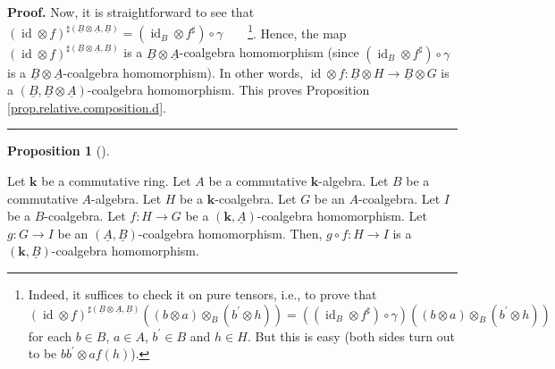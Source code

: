 \documentclass[numbers=enddot,12pt,final,onecolumn,notitlepage,abstracton]{scrartcl}%
\theoremstyle{definition}
\newtheorem{prop}[theo]{Proposition}
\newenvironment{proposition}[1][]
{\begin{prop}[#1]\begin{leftbar}}
{\end{leftbar}\end{prop}}
\newenvironment{proof}[1][Proof]{\noindent\textbf{#1.} }{\ \rule{0.5em}{0.5em}}
\begin{document}
\begin{proof}
Now, it is straightforward to see that $\left(  \operatorname*{id}\otimes
f\right)  ^{\sharp\left(  \underline{B}\otimes\underline{A},\underline{B}%
\right)  }=\left(  \operatorname*{id}\nolimits_{B}\otimes f^{\sharp}\right)
\circ\gamma$\ \ \ \ \footnote{Indeed, it suffices to check it on pure tensors,
i.e., to prove that
\[
\left(  \operatorname*{id}\otimes f\right)  ^{\sharp\left(  \underline{B}%
\otimes\underline{A},\underline{B}\right)  }\left(  \left(  b\otimes a\right)
\otimes_{B}\left(  b^{\prime}\otimes h\right)  \right)  =\left(  \left(
\operatorname*{id}\nolimits_{B}\otimes f^{\sharp}\right)  \circ\gamma\right)
\left(  \left(  b\otimes a\right)  \otimes_{B}\left(  b^{\prime}\otimes
h\right)  \right)
\]
for each $b\in B$, $a\in A$, $b^{\prime}\in B$ and $h\in H$. But this is easy
(both sides turn out to be $bb^{\prime}\otimes af\left(  h\right)  $).}.
Hence, the map $\left(  \operatorname*{id}\otimes f\right)  ^{\sharp\left(
\underline{B}\otimes\underline{A},\underline{B}\right)  }$ is a $\underline{B}%
\otimes\underline{A}$-coalgebra homomorphism (since $\left(
\operatorname*{id}\nolimits_{B}\otimes f^{\sharp}\right)  \circ\gamma$ is a
$\underline{B}\otimes\underline{A}$-coalgebra homomorphism). In other words,
$\operatorname*{id}\otimes f:\underline{B}\otimes H\rightarrow\underline{B}%
\otimes G$ is a $\left(  \underline{B},\underline{B}\otimes\underline{A}%
\right)  $-coalgebra homomorphism. This proves Proposition
\ref{prop.relative.composition.d}.
\end{proof}

\begin{proposition}
\label{prop.relative.composition.e}Let $\mathbf{k}$ be a commutative ring. Let
$A$ be a commutative $\mathbf{k}$-algebra. Let $B$ be a commutative
$A$-algebra. Let $H$ be a $\mathbf{k}$-coalgebra. Let $G$ be an $A$-coalgebra.
Let $I$ be a $B$-coalgebra. Let $f:H\rightarrow G$ be a $\left(
\mathbf{k},\underline{A}\right)  $-coalgebra homomorphism. Let $g:G\rightarrow
I$ be an $\left(  \underline{A},\underline{B}\right)  $-coalgebra
homomorphism. Then, $g\circ f:H\rightarrow I$ is a $\left(  \mathbf{k}%
,\underline{B}\right)  $-coalgebra homomorphism.
\end{proposition}
\end{document}
